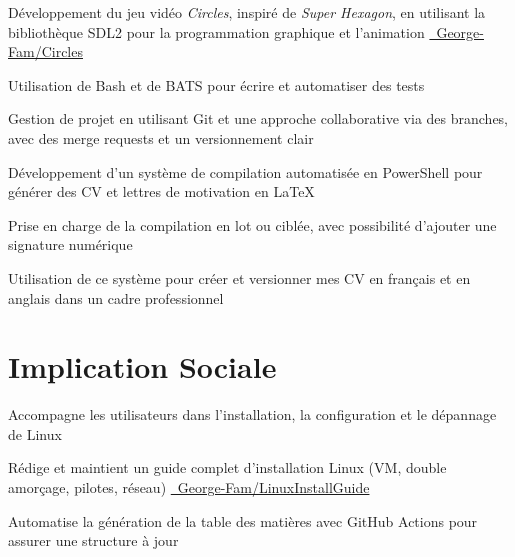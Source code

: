 \documentclass[letterpaper,10pt]{article}
\begin{document}
  \begin{resume_list}
    \item Développement du jeu vidéo \textit{Circles}, inspiré de \textit{Super Hexagon}, en utilisant la bibliothèque SDL2 pour la programmation graphique et l’animation {\small \href{https://github.com/George-Fam/Circles}{\faGithubSquare\ George-Fam/Circles}}
    \vspace{2pt}
    \item Utilisation de Bash et de BATS pour écrire et automatiser des tests
    \vspace{2pt}
    \item Gestion de projet en utilisant Git et une approche collaborative via des branches, avec des merge requests et un versionnement clair
  \end{resume_list}
  
  \begin{resume_list}
  \item Développement d’un système de compilation automatisée en PowerShell pour générer des CV et lettres de motivation en LaTeX   
  \item Prise en charge de la compilation en lot ou ciblée, avec possibilité d’ajouter une signature numérique
  \item Utilisation de ce système pour créer et versionner mes CV en français et en anglais dans un cadre professionnel
  \end{resume_list}


  \section{Implication Sociale}
  \begin{resume_list}
    \item Accompagne les utilisateurs dans l’installation, la configuration et le dépannage de Linux
    \item Rédige et maintient un guide complet d’installation Linux (VM, double amorçage, pilotes, réseau) {\small \href{https://github.com/George-Fam/LinuxInstallGuide}{\faGithubSquare\ George-Fam/LinuxInstallGuide}}
    \item Automatise la génération de la table des matières avec GitHub Actions pour assurer une structure à jour
  \end{resume_list}
  
\end{document}
